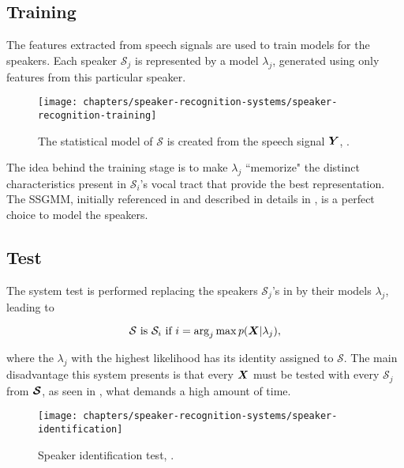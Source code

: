 \subsection{Training}

The features extracted from speech signals are used to train models for the speakers. Each speaker $\mathcal{S}_j$ is represented by a model $\lambda_j$, generated using only features from this particular speaker.

\begin{figure}[ht]
    \centering
    \texttt{[image: chapters/speaker-recognition-systems/speaker-recognition-training]}
    \caption{The statistical model of $\mathcal{S}$ is created from the speech signal $\boldsymbol{Y}$, .}
    \label{fig:speaker-recognition-training}
\end{figure}

The idea behind the training stage is to make $\lambda_j$ ``memorize" the distinct characteristics present in $\mathcal{S}_i$'s vocal tract that provide the best representation. The SSGMM, initially referenced in  and described in details in , is a perfect choice to model the speakers.

\subsection{Test}

The system test is performed replacing the speakers $\mathcal{S}_j$'s in  by their models $\lambda_j$, leading to

\begin{equation}
    \mathcal{S} \text{ is } \mathcal{S}_i \text{ if } i = \arg_j\max\postpdf{\boldsymbol{X}}{\lambda_j},
    \label{eq:speaker_identification}
\end{equation}

\noindent where the $\lambda_j$ with the highest likelihood has its identity assigned to $\mathcal{S}$. The main disadvantage this system presents is that every $\boldsymbol{X}$ must be tested with every $\mathcal{S}_j$ from $\boldsymbol{\mathcal{S}}$, as seen in , what demands a high amount of time.

\begin{figure}[ht]
    \centering
    \texttt{[image: chapters/speaker-recognition-systems/speaker-identification]}
    \caption{Speaker identification test, .}
    \label{fig:speaker_identification}
\end{figure}

